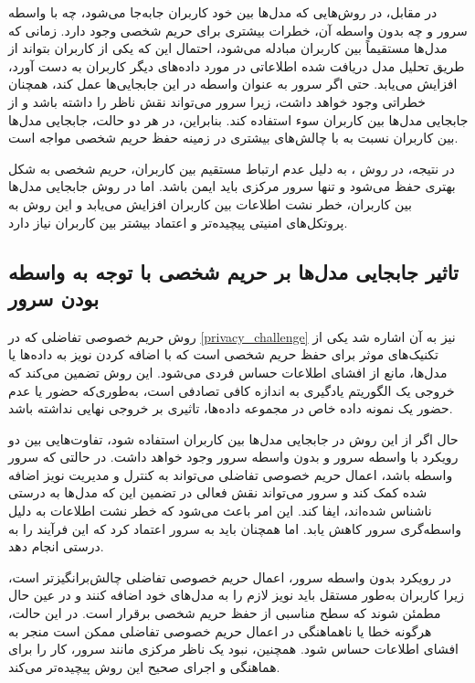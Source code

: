 در مقابل، در روش‌هایی که مدل‌ها بین خود کاربران جابه‌جا می‌شود، چه با واسطه سرور و چه بدون واسطه آن، خطرات بیشتری برای حریم شخصی وجود دارد. زمانی که مدل‌ها مستقیماً بین کاربران مبادله می‌شود، احتمال این که یکی از کاربران بتواند از طریق تحلیل مدل دریافت ‌شده اطلاعاتی در مورد داده‌های دیگر کاربران به دست آورد، افزایش می‌یابد. حتی اگر سرور به عنوان واسطه در این جابجایی‌ها عمل کند، همچنان خطراتی وجود خواهد داشت، زیرا سرور می‌تواند نقش ناظر را داشته باشد و از جابجایی مدل‌ها بین کاربران سوء استفاده کند. بنابراین، در هر دو حالت، جابجایی مدل‌ها بین کاربران نسبت به
با چالش‌های بیشتری در زمینه حفظ حریم شخصی مواجه است.

در نتیجه، در روش
%
، به دلیل عدم ارتباط مستقیم بین کاربران، حریم شخصی به شکل بهتری حفظ می‌شود و تنها سرور مرکزی باید ایمن باشد. اما در روش جابجایی مدل‌ها بین کاربران، خطر نشت اطلاعات بین کاربران افزایش می‌یابد و این روش به پروتکل‌های امنیتی پیچیده‌تر و اعتماد بیشتر بین کاربران نیاز دارد.


\subsection{
	تاثیر جابجایی مدل‌ها بر حریم شخصی با توجه به واسطه بودن سرور
}
روش حریم خصوصی تفاضلی که در
\ref{privacy_challenge}
نیز به آن اشاره شد یکی از تکنیک‌های موثر برای حفظ حریم شخصی است که با اضافه کردن نویز به داده‌ها یا مدل‌ها، مانع از افشای اطلاعات حساس فردی می‌شود. این روش تضمین می‌کند که خروجی یک الگوریتم یادگیری به اندازه کافی تصادفی است، به‌طوری‌که حضور یا عدم حضور یک نمونه داده خاص در مجموعه داده‌ها، تاثیری بر خروجی نهایی نداشته باشد.

حال اگر از این روش در جابجایی مدل‌ها بین کاربران استفاده شود، تفاوت‌هایی بین دو رویکرد با واسطه سرور و بدون واسطه سرور وجود خواهد داشت. در حالتی که سرور واسطه باشد، اعمال حریم خصوصی تفاضلی می‌تواند به کنترل و مدیریت نویز اضافه شده کمک کند و سرور می‌تواند نقش فعالی در تضمین این که مدل‌ها به درستی ناشناس‌ شده‌اند، ایفا کند. این امر باعث می‌شود که خطر نشت اطلاعات به دلیل واسطه‌گری سرور کاهش یابد. اما همچنان باید به سرور اعتماد کرد که این فرآیند را به درستی انجام دهد.

در رویکرد بدون واسطه سرور، اعمال حریم خصوصی تفاضلی چالش‌برانگیزتر است، زیرا کاربران به‌طور مستقل باید نویز لازم را به مدل‌های خود اضافه کنند و در عین حال مطمئن شوند که سطح مناسبی از حفظ حریم شخصی برقرار است. در این حالت، هرگونه خطا یا ناهماهنگی در اعمال حریم خصوصی تفاضلی ممکن است منجر به افشای اطلاعات حساس شود. همچنین، نبود یک ناظر مرکزی مانند سرور، کار را برای هماهنگی و اجرای صحیح این روش پیچیده‌تر می‌کند.

